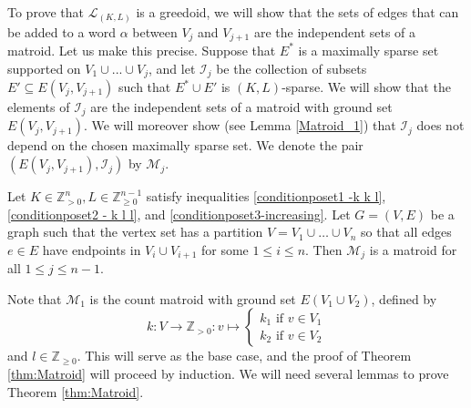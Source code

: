 \documentclass{article}
\begin{document}
\begin{example}
\begin{figure}[h!]
\end{figure}
\end{example}






To prove that $\mathcal{L}_{(K,L)}$ is a greedoid, we will show that the sets of edges that can be added to a word $\alpha$ between $V_j$ and $V_{j+1}$ are the independent sets of a matroid. Let us make this precise. Suppose that $E^*$ is a maximally sparse set supported on $V_1 \cup...\cup V_{j}$, and let $\mathcal{I}_j$ be the collection of subsets $E' \subseteq E(V_{j},V_{j+1})$ such that $E^* \cup E'$ is $(K,L)$-sparse. We will show that the elements of $\mathcal{I}_j$ are the independent sets of a matroid with ground set $E(V_{j},V_{j+1})$. We will moreover show (see Lemma \ref{Matroid_1}) that $\mathcal{I}_j$ does not depend on the chosen maximally sparse set. We denote the pair $(E(V_{j},V_{j+1}), \mathcal{I}_j)$ by $\mathcal{M}_j.$


\begin{theorem}\label{thm:Matroid}
Let $K  \in \mathbb{Z}_{>0}^{n}, L \in \mathbb{Z}_{\geq 0}^{n-1}$ satisfy inequalities \eqref{conditionposet1 -k k l}, \eqref{conditionposet2 - k l l}, and \eqref{conditionposet3-increasing}. Let $G=(V,E)$ be a graph such that the vertex set has a partition $V=V_1\cup \dots \cup V_n$ so that all edges $e\in E$ have endpoints in $V_{i} \cup V_{i+1}$ for some $1 \leq i \leq n$. Then $\mathcal{M}_{j}$ is a matroid for all $1\leq j \leq n-1$.
\end{theorem}

 Note that $\mathcal{M}_{1}$ is the count matroid with ground set $E(V_1\cup V_2)$, defined by 
\begin{equation*}
    k: V\rightarrow \mathbb{Z}_{>0} : v\mapsto  \begin{cases}
        k_1 \text{ if } v\in V_1\\
     k_2 \text{ if } v\in V_2
    \end{cases}
\end{equation*}
and $l \in \mathbb{Z}_{\geq 0}$. This will serve as the base case, and the proof of Theorem \ref{thm:Matroid} will proceed by induction. We will need several lemmas to prove Theorem \ref{thm:Matroid}.
\end{document}
